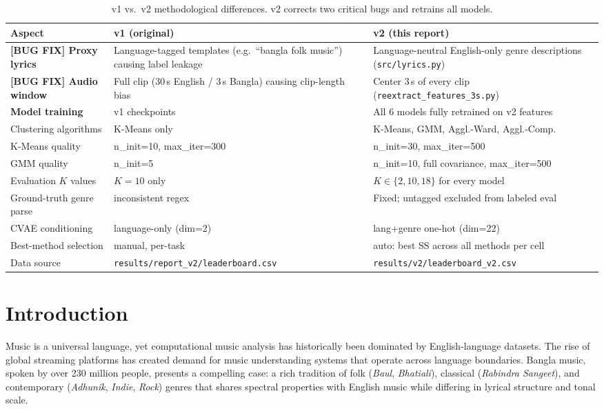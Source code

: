 \documentclass{article}
\begin{document}
\begin{table}[H]
\centering
\caption{v1 vs.\ v2 methodological differences. v2 corrects two critical bugs and retrains all models.}
\label{tab:changelist}
\small
\begin{tabular}{p{3.6cm}p{4.5cm}p{5cm}}
\toprule
\textbf{Aspect} & \textbf{v1 (original)} & \textbf{v2 (this report)} \\
\midrule
\textbf{[BUG FIX] Proxy lyrics} & Language-tagged templates (e.g.\ ``bangla folk music'') causing label leakage & Language-neutral English-only genre descriptions (\texttt{src/lyrics.py}) \\
\textbf{[BUG FIX] Audio window} & Full clip (30\,s English / 3\,s Bangla) causing clip-length bias & Center 3\,s of every clip (\texttt{reextract\_features\_3s.py}) \\
\textbf{Model training} & v1 checkpoints & All 6 models fully retrained on v2 features \\
Clustering algorithms & K-Means only & K-Means, GMM, Aggl.-Ward, Aggl.-Comp. \\
K-Means quality & n\_init=10, max\_iter=300 & n\_init=30, max\_iter=500 \\
GMM quality & n\_init=5 & n\_init=10, full covariance, max\_iter=500 \\
Evaluation $K$ values & $K\!=\!10$ only & $K\!\in\!\{2,10,18\}$ for every model \\
Ground-truth genre parse & inconsistent regex & Fixed; untagged excluded from labeled eval \\
CVAE conditioning & language-only (dim=2) & lang+genre one-hot (dim=22) \\
Best-method selection & manual, per-task & auto: best SS across all methods per cell \\
Data source & \texttt{results/report\_v2/leaderboard.csv} & \texttt{results/v2/leaderboard\_v2.csv} \\
\bottomrule
\end{tabular}
\end{table}

\section{Introduction}

Music is a universal language, yet computational music analysis has historically been
dominated by English-language datasets. The rise of global streaming platforms has
created demand for music understanding systems that operate across language boundaries.
Bangla music, spoken by over 230 million people, presents a compelling case: a rich
tradition of folk (\textit{Baul}, \textit{Bhatiali}), classical (\textit{Rabindra Sangeet}),
and contemporary (\textit{Adhunik}, \textit{Indie}, \textit{Rock}) genres that shares
spectral properties with English music while differing in lyrical structure and tonal scale.
\end{document}
